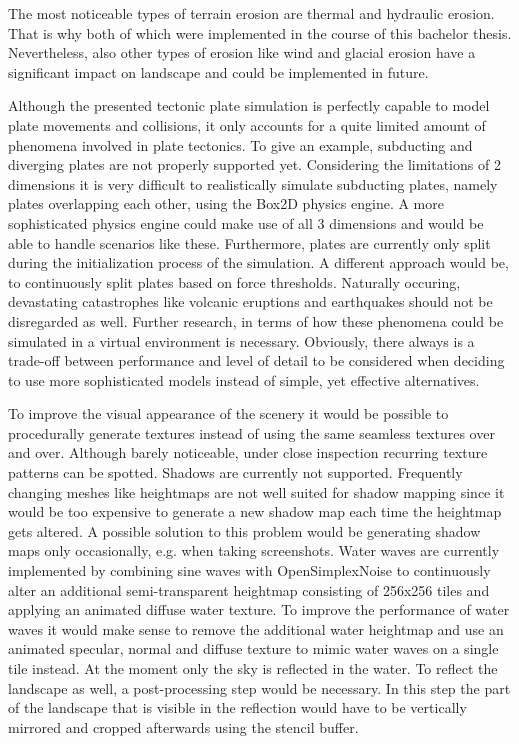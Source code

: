 \documentclass[11pt,a4paper,twoside,openright]{report}
\begin{document}
The most noticeable types of terrain erosion are thermal and hydraulic erosion. That is why both of which were implemented in the course of this bachelor thesis. Nevertheless, also other types of erosion like wind and glacial erosion have a significant impact on landscape and could be implemented in future.

Although the presented tectonic plate simulation is perfectly capable to model plate movements and collisions, it only accounts for a quite limited amount of phenomena involved in plate tectonics. To give an example, subducting and diverging plates are not properly supported yet. Considering the limitations of 2 dimensions it is very difficult to realistically simulate subducting plates, namely plates overlapping each other, using the Box2D physics engine. A more sophisticated physics engine could make use of all 3 dimensions and would be able to handle scenarios like these. Furthermore, plates are currently only split during the initialization process of the simulation. A different approach would be, to continuously split plates based on force thresholds. Naturally occuring, devastating catastrophes like volcanic eruptions and earthquakes should not be disregarded as well. Further research, in terms of how these phenomena could be simulated in a virtual environment is necessary. Obviously, there always is a trade-off between performance and level of detail to be considered when deciding to use more sophisticated models instead of simple, yet effective alternatives.

To improve the visual appearance of the scenery it would be possible to procedurally generate textures instead of using the same seamless textures over and over. Although barely noticeable, under close inspection recurring texture patterns can be spotted.
Shadows are currently not supported. Frequently changing meshes like heightmaps are not well suited for shadow mapping since it would be too expensive to generate a new shadow map each time the heightmap gets altered. A possible solution to this problem would be generating shadow maps only occasionally, e.g. when taking screenshots.
Water waves are currently implemented by combining sine waves with OpenSimplexNoise to continuously alter an additional semi-transparent heightmap consisting of 256x256 tiles and applying an animated diffuse water texture. To improve the performance of water waves it would make sense to remove the additional water heightmap and use an animated specular, normal and diffuse texture to mimic water waves on a single tile instead.
At the moment only the sky is reflected in the water. To reflect the landscape as well, a post-processing step would be necessary. In this step the part of the landscape that is visible in the reflection would have to be vertically mirrored and cropped afterwards using the stencil buffer.




\end{document}
